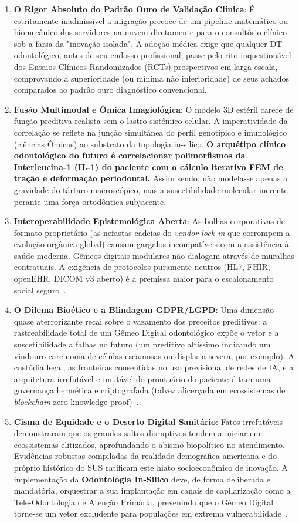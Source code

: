 \begin{enumerate}
    \item \textbf{O Rigor Absoluto do Padrão Ouro de Validação Clínica}: É estritamente inadmissível a migração precoce de um pipeline matemático ou biomecânico dos servidores na nuvem diretamente para o consultório clínico sob a farsa da "inovação isolada". A adoção médica exige que qualquer DT odontológico, antes de seu endosso profissional, passe pelo rito inquestionável dos Ensaios Clínicos Randomizados (RCTs) prospectivos em larga escala, comprovando a superioridade (ou mínima não inferioridade) de seus achados comparados ao padrão ouro diagnóstico convencional.
    \item \textbf{Fusão Multimodal e Ômica Imagiológica}: O modelo 3D estéril carece de função preditiva realista sem o lastro sistêmico celular. A imperatividade da correlação se reflete na junção simultânea do perfil genotípico e imunológico (ciências Ômicas) ao substrato da topologia in-silico. \textbf{O arquétipo clínico odontológico do futuro é correlacionar polimorfismos da Interleucina-1 (IL-1) do paciente com o cálculo iterativo FEM de tração e deformação periodontal.} Assim sendo, não modela-se apenas a gravidade do tártaro macroscópico, mas a suscetibilidade molecular inerente perante uma força ortodôntica subjacente.
    \item \textbf{Interoperabilidade Epistemológica Aberta}: As bolhas corporativas de formato proprietário (as nefastas cadeias do \textit{vendor lock-in} que corrompem a evolução orgânica global) causam gargalos incompatíveis com a assistência à saúde moderna. Gêmeos digitais modulares não dialogam através de muralhas contratuais. A exigência de protocolos puramente neutros (HL7, FHIR, openEHR, DICOM v3 aberto) é a premissa maior para o escalonamento social seguro~\cite{robles2023opentwins}.
    \item \textbf{O Dilema Bioético e a Blindagem GDPR/LGPD}: Uma dimensão quase aterrorizante recai sobre o vazamento dos preceitos preditivos: a rastreabilidade total de um Gêmeo Digital odontológico expõe o vetor e a suscetibilidade a falhas no futuro (um preditivo altíssimo indicando um vindouro carcinoma de células escamosas ou displasia severa, por exemplo). A custódia legal, as fronteiras consentidas no uso previsional de redes de IA, e a arquitetura irrefutável e imutável do prontuário do paciente ditam uma governança hermética e criptografada (talvez alicerçada em ecossistemas de \textit{blockchain} zero-knowledge proof)~\cite{springer2026realising}.
    \item \textbf{Cisma de Equidade e o Deserto Digital Sanitário}: Fatos irrefutáveis demonstraram que os grandes saltos disruptivos tendem a iniciar em ecossistemas elitizados, aprofundando o abismo biopolítico no atendimento. Evidências robustas compiladas da realidade demográfica americana e do próprio histórico do SUS ratificam este hiato socioeconômico de inovação. A implementação da \textbf{Odontologia In-Silico} deve, de forma deliberada e mandatória, orquestrar a sua implantação em canais de capilarização como a Tele-Odontologia de Atenção Primária, prevenindo que o Gêmeo Digital torne-se um vetor excludente para populações em extrema vulnerabilidade~\cite{cuadros2023assessing}.

\end{enumerate}
